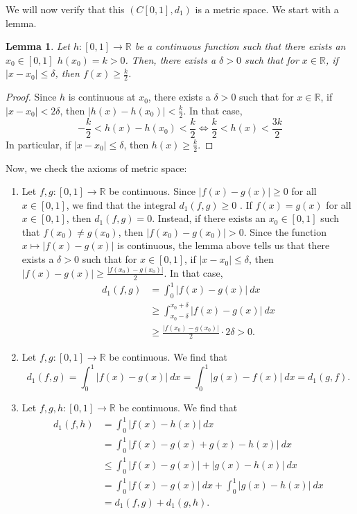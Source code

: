 \documentclass[a4paper, openany]{memoir}
\theoremstyle{definition}
\theoremstyle{plain}
\newtheorem{lemma}[definition]{Lemma}
\begin{document}
We will now verify that this $(C[0, 1], d_1)$ is a metric space. We start with a lemma.
\begin{lemma}
Let $h: [0, 1] \to \mathbb{R}$ be a continuous function such that there exists an $x_0 \in [0, 1]$ $h(x_0) = k > 0$. Then, there exists a $\delta > 0$ such that for $x \in \mathbb{R}$, if $|x - x_0| \leqslant \delta$, then $f(x) \geqslant \frac{k}{2}$.
\end{lemma}
\begin{proof}
Since $h$ is continuous at $x_0$, there exists a $\delta > 0$ such that for $x \in \mathbb{R}$, if $|x - x_0| < 2\delta$, then $|h(x) - h(x_0)| < \frac{k}{2}$. In that case,
\[-\frac{k}{2} < h(x) - h(x_0) < \frac{k}{2} \iff \frac{k}{2} < h(x) < \frac{3k}{2}\]
In particular, if $|x - x_0| \leqslant \delta$, then $h(x) \geqslant \frac{k}{2}$.
\end{proof}
\noindent Now, we check the axioms of metric space:
\begin{enumerate}[label=\textbf{M\arabic*}.]
    \item Let $f, g: [0, 1] \to \mathbb{R}$ be continuous. Since $|f(x) - g(x)| \geqslant 0$ for all $x \in [0, 1]$, we find that the integral $d_1(f, g) \geqslant 0$ . If $f(x) = g(x)$ for all $x \in [0, 1]$, then $d_1(f, g) = 0$. Instead, if there exists an $x_0 \in [0, 1]$ such that $f(x_0) \neq g(x_0)$, then $|f(x_0) - g(x_0)| > 0$. Since the function $x \mapsto |f(x) - g(x)|$ is continuous, the lemma above tells us that there exists a $\delta > 0$ such that for $x \in [0, 1]$, if $|x - x_0| \leqslant \delta$, then $|f(x) - g(x)| \geqslant \frac{|f(x_0) - g(x_0)|}{2}$. In that case,
    \begin{align*}
        d_1(f, g) &= \int_{0}^1 |f(x) - g(x)| \ dx \\
        &\geqslant \int_{x_0 - \delta}^{x_0 + \delta} |f(x) - g(x)| \ dx \\
        &\geqslant \frac{|f(x_0) - g(x_0)|}{2} \cdot 2\delta > 0.
    \end{align*}
    
    \item Let $f, g: [0, 1] \to \mathbb{R}$ be continuous. We find that
    \[d_1(f, g) = \int_0^1 |f(x) - g(x)| \ dx = \int_0^1 |g(x) - f(x)| \ dx = d_1(g, f).\]
    
    \item Let $f, g, h: [0, 1] \to \mathbb{R}$ be continuous. We find that
    \begin{align*}
        d_1(f, h) &= \int_0^1 |f(x) - h(x)| \ dx \\
        &= \int_0^1 |f(x) - g(x) + g(x) - h(x)| \ dx \\
        &\leqslant \int_0^1 |f(x) - g(x)| + |g(x) - h(x)| \ dx \\
        &= \int_0^1 |f(x) - g(x)| \ dx + \int_0^1 |g(x) - h(x)| \ dx \\
        &= d_1(f, g) + d_1(g, h).
    \end{align*}
\end{enumerate}
\end{document}

